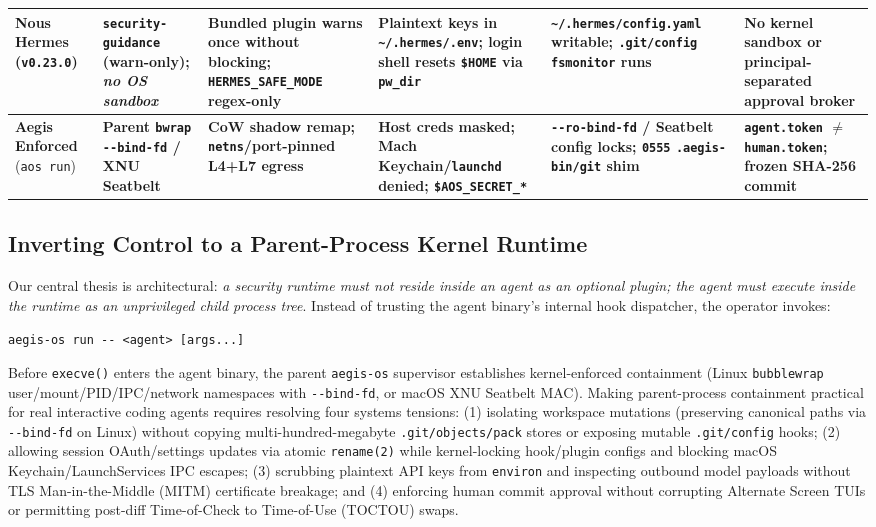 \documentclass[10pt,journal,compsoc]{IEEEtran}
\begin{document}
\begin{table}[!t]
\begin{tabularx}{\textwidth}{@{}l>{\raggedright\arraybackslash}p{2.62cm}YYYY@{}}
\addlinespace[2pt]
\textbf{Nous Hermes} (\texttt{v0.23.0}) & \texttt{security-\allowbreak guidance} (warn-only); \emph{no OS sandbox} & Bundled plugin warns once without blocking; \texttt{HERMES\_\allowbreak SAFE\_MODE} regex-only & Plaintext keys in \texttt{\textasciitilde/.hermes/\allowbreak .env}; login shell resets \texttt{\$HOME} via \texttt{pw\_dir} & \texttt{\textasciitilde/.hermes/\allowbreak config.yaml} writable; \texttt{.git/config} \texttt{fsmonitor} runs & No kernel sandbox or principal-separated approval broker \\
\midrule
\textbf{Aegis Enforced} (\texttt{aos run}) & \textbf{Parent \texttt{bwrap -\/-bind-fd} / XNU Seatbelt} & \textbf{CoW shadow remap; \texttt{netns}/\allowbreak port-pinned L4+L7 egress} & \textbf{Host creds masked; Mach Keychain/\allowbreak\texttt{launchd} denied; \texttt{\$AOS\_\allowbreak SECRET\_*}} & \textbf{\texttt{-\/-ro-bind-fd} / Seatbelt config locks; \texttt{0555} \texttt{.aegis-bin/\allowbreak git} shim} & \textbf{\texttt{agent.token} $\neq$ \texttt{human.token}; frozen SHA-256 commit} \\
\bottomrule
\end{tabularx}
\end{table}

\subsection{Inverting Control to a Parent-Process Kernel Runtime}

Our central thesis is architectural: \emph{a security runtime must not reside inside an agent as an optional plugin; the agent must execute inside the runtime as an unprivileged child process tree}. Instead of trusting the agent binary's internal hook dispatcher, the operator invokes:
\begin{center}
{\footnotesize\texttt{aegis-os run -\/- <agent> [args...]}}
\end{center}
Before \texttt{execve()} enters the agent binary, the parent \texttt{aegis-os} supervisor establishes kernel-enforced containment (Linux \texttt{bubblewrap}~\cite{containers2024bubblewrap} user/\allowbreak mount/\allowbreak PID/\allowbreak IPC/\allowbreak network namespaces with \texttt{-\/-bind-fd}, or macOS XNU Seatbelt MAC). Making parent-process containment practical for real interactive coding agents requires resolving four systems tensions: (1) isolating workspace mutations (preserving canonical paths via \texttt{-\/-bind-fd} on Linux) without copying multi-hundred-megabyte \texttt{.git/objects/pack} stores or exposing mutable \texttt{.git/config} hooks; (2) allowing session OAuth/settings updates via atomic \texttt{rename(2)} while kernel-locking hook/plugin configs and blocking macOS Keychain/LaunchServices IPC escapes; (3) scrubbing plaintext API keys from \texttt{environ} and inspecting outbound model payloads without TLS Man-in-the-Middle (MITM) certificate breakage; and (4) enforcing human commit approval without corrupting Alternate Screen TUIs or permitting post-diff Time-of-Check to Time-of-Use (TOCTOU) swaps.
\end{document}
